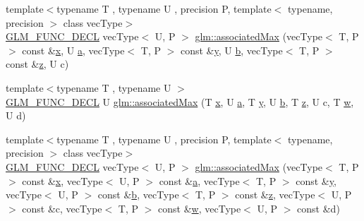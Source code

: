 \begin{DoxyCompactItemize}
{\footnotesize template$<$typename T , typename U , precision P, template$<$ typename, precision $>$ class vec\+Type$>$ }\\\mbox{\hyperlink{setup_8hpp_ab2d052de21a70539923e9bcbf6e83a51}{G\+L\+M\+\_\+\+F\+U\+N\+C\+\_\+\+D\+E\+CL}} vec\+Type$<$ U, P $>$ \mbox{\hyperlink{group__gtx__associated__min__max_ga327136e6a568569c03a056f90814b656}{glm\+::associated\+Max}} (vec\+Type$<$ T, P $>$ const \&\mbox{\hyperlink{glad_8h_a92d0386e5c19fb81ea88c9f99644ab1d}{x}}, U \mbox{\hyperlink{glad_8h_ac8729153468b5dcf13f971b21d84d4e5}{a}}, vec\+Type$<$ T, P $>$ const \&\mbox{\hyperlink{glad_8h_a66ddd433d2cacfe27f5906b7e86faeed}{y}}, U \mbox{\hyperlink{glad_8h_a6eba317e3cf44d6d26c04a5a8f197dcb}{b}}, vec\+Type$<$ T, P $>$ const \&\mbox{\hyperlink{glad_8h_acb78bf1972d3eaf07da34ff2e0a2f133}{z}}, U c)
\item 
{\footnotesize template$<$typename T , typename U $>$ }\\\mbox{\hyperlink{setup_8hpp_ab2d052de21a70539923e9bcbf6e83a51}{G\+L\+M\+\_\+\+F\+U\+N\+C\+\_\+\+D\+E\+CL}} U \mbox{\hyperlink{group__gtx__associated__min__max_ga3038ffcb43eaa6af75897a99a5047ccc}{glm\+::associated\+Max}} (T \mbox{\hyperlink{glad_8h_a92d0386e5c19fb81ea88c9f99644ab1d}{x}}, U \mbox{\hyperlink{glad_8h_ac8729153468b5dcf13f971b21d84d4e5}{a}}, T \mbox{\hyperlink{glad_8h_a66ddd433d2cacfe27f5906b7e86faeed}{y}}, U \mbox{\hyperlink{glad_8h_a6eba317e3cf44d6d26c04a5a8f197dcb}{b}}, T \mbox{\hyperlink{glad_8h_acb78bf1972d3eaf07da34ff2e0a2f133}{z}}, U c, T \mbox{\hyperlink{glad_8h_a1d0296e9e835f2e1ee17634af95fc1ec}{w}}, U d)
\item 
{\footnotesize template$<$typename T , typename U , precision P, template$<$ typename, precision $>$ class vec\+Type$>$ }\\\mbox{\hyperlink{setup_8hpp_ab2d052de21a70539923e9bcbf6e83a51}{G\+L\+M\+\_\+\+F\+U\+N\+C\+\_\+\+D\+E\+CL}} vec\+Type$<$ U, P $>$ \mbox{\hyperlink{group__gtx__associated__min__max_gaf607886421c35cd7e4f41a50d7c330e3}{glm\+::associated\+Max}} (vec\+Type$<$ T, P $>$ const \&\mbox{\hyperlink{glad_8h_a92d0386e5c19fb81ea88c9f99644ab1d}{x}}, vec\+Type$<$ U, P $>$ const \&\mbox{\hyperlink{glad_8h_ac8729153468b5dcf13f971b21d84d4e5}{a}}, vec\+Type$<$ T, P $>$ const \&\mbox{\hyperlink{glad_8h_a66ddd433d2cacfe27f5906b7e86faeed}{y}}, vec\+Type$<$ U, P $>$ const \&\mbox{\hyperlink{glad_8h_a6eba317e3cf44d6d26c04a5a8f197dcb}{b}}, vec\+Type$<$ T, P $>$ const \&\mbox{\hyperlink{glad_8h_acb78bf1972d3eaf07da34ff2e0a2f133}{z}}, vec\+Type$<$ U, P $>$ const \&c, vec\+Type$<$ T, P $>$ const \&\mbox{\hyperlink{glad_8h_a1d0296e9e835f2e1ee17634af95fc1ec}{w}}, vec\+Type$<$ U, P $>$ const \&d)

\end{DoxyCompactItemize}
